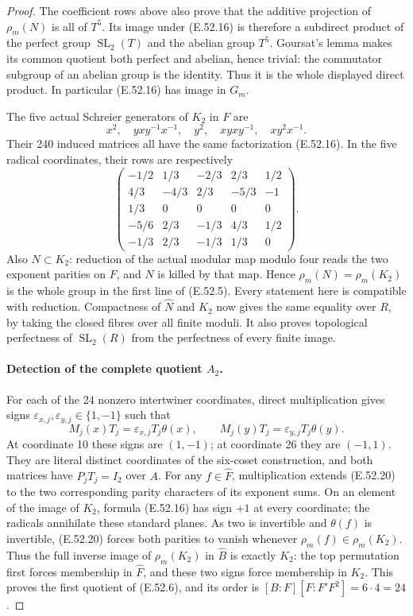 \begin{proof}
The coefficient rows above also prove that the
additive projection of $\rho_m(N)$ is all of $T^5$.
Its image under \textup{(E.52.16)} is therefore a
subdirect product of the perfect group
$\operatorname{SL}_2(T)$ and the abelian group $T^5$.
Goursat's lemma makes its common quotient both
perfect and abelian, hence trivial: the commutator
subgroup of an abelian group is the identity.
Thus it is the whole displayed direct product.
In particular \textup{(E.52.16)} has image in $G_m$.

The five actual Schreier generators of $K_2$ in $F$
are
\[
 x^2,\quad yxy^{-1}x^{-1},\quad y^2,
       \quad xyxy^{-1},\quad xy^2x^{-1}.
 \tag{E.52.18}
\]
Their 240 induced matrices all have the same
factorization \textup{(E.52.16)}. In the five radical
coordinates, their rows are respectively
\[
 \begin{pmatrix}
 -1/2&1/3&-2/3&2/3&1/2\\
 4/3&-4/3&2/3&-5/3&-1\\
 1/3&0&0&0&0\\
 -5/6&2/3&-1/3&4/3&1/2\\
 -1/3&2/3&-1/3&1/3&0
 \end{pmatrix}.
 \tag{E.52.19}
\]
Also $N\subset K_2$: reduction of the actual modular
map modulo four reads the two exponent parities on
$F$, and $N$ is killed by that map.
Hence $\rho_m(N)=\rho_m(K_2)$ is the whole group in
the first line of \textup{(E.52.5)}.
Every statement here is compatible with reduction.
Compactness of $\widehat N$ and $K_2$ now gives the
same equality over $R$, by taking the closed fibres
over all finite moduli. It also proves topological
perfectness of $\operatorname{SL}_2(R)$ from the
perfectness of every finite image.

\paragraph{Detection of the complete quotient $A_2$.}
For each of the 24 nonzero intertwiner coordinates,
direct multiplication gives signs
$\varepsilon_{x,j},\varepsilon_{y,j}\in\{1,-1\}$
such that
\[
 M_j(x)T_j=\varepsilon_{x,j}T_j\theta(x),\qquad
 M_j(y)T_j=\varepsilon_{y,j}T_j\theta(y).
 \tag{E.52.20}
\]
At coordinate 10 these signs are $(1,-1)$; at
coordinate 26 they are $(-1,1)$.
They are literal distinct coordinates of the
six-coset construction, and both matrices have
$P_jT_j=I_2$ over $A$.
For any $f\in\widehat F$, multiplication extends
\textup{(E.52.20)} to the two corresponding parity
characters of its exponent sums.
On an element of the image of $K_2$, formula
\textup{(E.52.16)} has sign $+1$ at every coordinate;
the radicals annihilate these standard planes.
As two is invertible and $\theta(f)$ is invertible,
\textup{(E.52.20)} forces both parities to vanish
whenever $\rho_m(f)\in\rho_m(K_2)$.
Thus the full inverse image of $\rho_m(K_2)$ in
$\widehat B$ is exactly $K_2$: the top permutation
first forces membership in $\widehat F$, and these
two signs force membership in $K_2$.
This proves the first quotient of
\textup{(E.52.6)}, and its order is
$[B:F][F:F'F^2]=6\cdot4=24$.


\end{proof}
